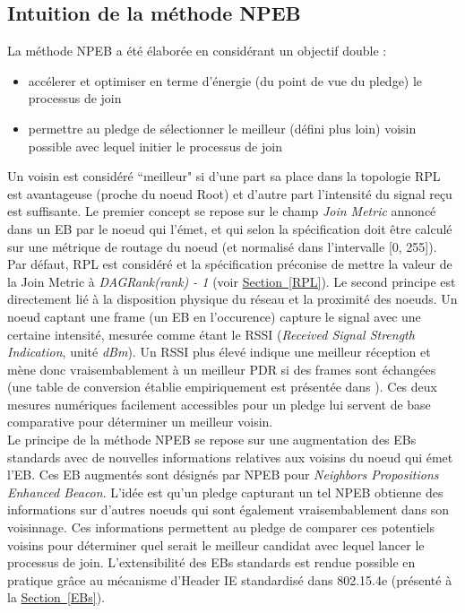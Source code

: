 \documentclass[]{report}
\newcommand{\wordlink}[2]{\hyperref[#2]{#1~\ref{#2}}}
\begin{document}
\subsection{Intuition de la méthode NPEB}

La méthode NPEB a été élaborée en considérant un objectif double :
\begin{itemize}[label=$\bullet$]
\item accélerer et optimiser en terme d'énergie (du point de vue du pledge) le processus de join
\item permettre au pledge de sélectionner le meilleur (défini plus loin) voisin possible avec lequel initier le processus de join
\end{itemize}

Un voisin est considéré ``meilleur" si d'une part sa place dans la topologie RPL est avantageuse (proche du noeud Root) et d'autre part l'intensité du signal reçu est suffisante.  Le premier concept se repose sur le champ \textit{Join Metric} annoncé dans un EB par le noeud qui l'émet, et qui selon la spécification \cite{rfc8180} doit être calculé sur une métrique de routage du noeud (et normalisé dans l'intervalle [0, 255]). Par défaut, RPL est considéré et la spécification préconise de mettre la valeur de la Join Metric à \textit{DAGRank(rank) - 1} (voir \wordlink{Section}{RPL}). Le second principe est directement lié à la disposition physique du réseau et la proximité des noeuds. Un noeud captant une frame (un EB en l'occurence) capture le signal avec une certaine intensité, mesurée comme étant le RSSI (\textit{Received Signal Strength Indication}, unité \textit{dBm}). Un RSSI plus élevé indique une meilleur réception et mène donc vraisembablement à un meilleur PDR si des frames sont échangées (une table de conversion établie empiriquement est présentée dans \cite{simulating-6TiSCH}). Ces deux mesures numériques facilement accessibles pour un pledge lui servent de base comparative pour déterminer un meilleur voisin.\\

Le principe de la méthode NPEB se repose sur une augmentation des EBs standards avec de nouvelles informations relatives aux voisins du noeud qui émet l'EB. Ces EB augmentés sont désignés par NPEB pour \textit{Neighbors Propositions Enhanced Beacon}. L'idée est qu'un pledge capturant un tel NPEB obtienne des informations sur d'autres noeuds qui sont également vraisembablement dans son voisinnage. Ces informations permettent au pledge de comparer ces potentiels voisins pour déterminer quel serait le meilleur candidat avec lequel lancer le processus de join. L'extensibilité des EBs standards est rendue possible en pratique grâce au mécanisme d'Header IE standardisé dans 802.15.4e (présenté à la \wordlink{Section}{EBs}).\\
\end{document}
